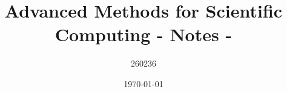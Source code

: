 \author{260236}
\title{Advanced Methods for Scientific Computing - Notes - \version}
\date{\printdayoff\today}
\maketitle